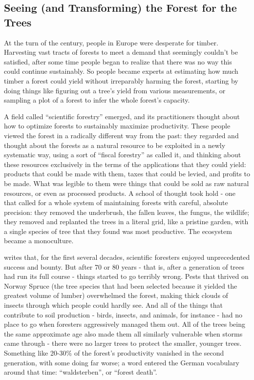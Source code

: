 \documentclass[manuscript,screen]{acmart}
\begin{document}
\subsection{Seeing (and Transforming) the Forest for the Trees}

At the turn of the  century, people in Europe were desperate for timber.
Harvesting vast tracts of forests to meet a demand that seemingly couldn't be satisfied, after some time people began to realize that there was no way this could continue sustainably.
So people became experts at estimating how much timber a forest could yield without irreparably harming the forest, starting by doing things like figuring out a tree's yield from various measurements, or sampling a plot of a forest to infer the whole forest's capacity.

A field called ``scientific forestry'' emerged, and its practitioners thought about how to optimize forests to sustainably maximize productivity.
These people viewed the forest in a radically different way from the past: they regarded and thought about the forests as a natural resource to be exploited in a newly systematic way, using a sort of ``fiscal forestry'' as \citeauthor{scott1998seeing} called it, and thinking about these resources exclusively in the terms of the applications that they could yield: products that could be made with them, taxes that could be levied, and profits to be made.
What was legible to them were things that could be sold as raw natural resources, or even as processed products.
A school of thought took hold - one that called for a whole system of maintaining forests with careful, absolute precision: they removed the underbrush, the fallen leaves, the fungus, the wildlife;
they removed and replanted the trees in a literal grid, like a pristine garden, with a single species of tree that they found was most productive.
The ecosystem became a monoculture.

\citeauthor{scott1998seeing} writes that, for the first several decades, scientific foresters enjoyed unprecedented success and bounty.
But after 70 or 80 years - that is, after a generation of trees had run its full course - things started to go terribly wrong.
Pests that thrived on Norway Spruce (the tree species that had been selected because it yielded the greatest volume of lumber) overwhelmed the forest, making thick clouds of insects through which people could hardly see.
And all of the things that contribute to soil production - birds, insects, and animals, for instance - had no place to go when foresters aggressively managed them out.
All of the trees being the same approximate age also made them all similarly vulnerable when storms came through - there were no larger trees to protect the smaller, younger trees.
Something like 20-30\% of the forest's productivity vanished in the second generation, with some doing far worse;
a word entered the German vocabulary around that time: ``waldsterben'', or ``forest death''.
\end{document}
